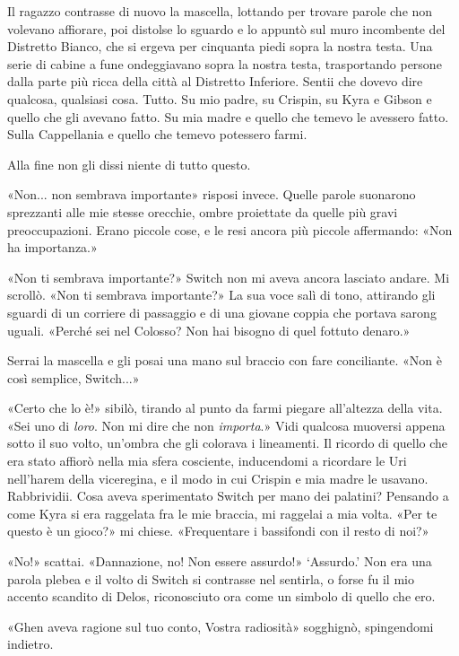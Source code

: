 Il ragazzo contrasse di nuovo la mascella, lottando per trovare parole
che non volevano affiorare, poi distolse lo sguardo e lo appuntò sul
muro incombente del Distretto Bianco, che si ergeva per cinquanta piedi
sopra la nostra testa. Una serie di cabine a fune ondeggiavano sopra la
nostra testa, trasportando persone dalla parte più ricca della città al
Distretto Inferiore. Sentii che dovevo dire qualcosa, qualsiasi cosa.
Tutto. Su mio padre, su Crispin, su Kyra e Gibson e quello che gli
avevano fatto. Su mia madre e quello che temevo le avessero fatto. Sulla
Cappellania e quello che temevo potessero farmi.

Alla fine non gli dissi niente di tutto questo.

«Non... non sembrava importante» risposi invece. Quelle parole suonarono
sprezzanti alle mie stesse orecchie, ombre proiettate da quelle più
gravi preoccupazioni. Erano piccole cose, e le resi ancora più piccole
affermando: «Non ha importanza.»

«Non ti sembrava importante?» Switch non mi aveva ancora lasciato
andare. Mi scrollò. «Non ti sembrava importante?» La sua voce salì di
tono, attirando gli sguardi di un corriere di passaggio e di una giovane
coppia che portava sarong uguali. «Perché sei nel Colosso? Non hai
bisogno di quel fottuto denaro.»

Serrai la mascella e gli posai una mano sul braccio con fare
conciliante. «Non è così semplice, Switch...»

«Certo che lo è!» sibilò, tirando al punto da farmi piegare all'altezza
della vita. «Sei uno di \emph{loro}. Non mi dire che non
\emph{importa}.» Vidi qualcosa muoversi appena sotto il suo volto,
un'ombra che gli colorava i lineamenti. Il ricordo di quello che era
stato affiorò nella mia sfera cosciente, inducendomi a ricordare le Uri
nell'harem della viceregina, e il modo in cui Crispin e mia madre le
usavano. {Rabbrividii}. Cosa aveva sperimentato Switch per mano dei
palatini? Pensando a come Kyra si era raggelata fra le mie braccia, mi
raggelai a mia volta. «Per te questo è un gioco?» mi chiese.
«Frequentare i bassifondi con il resto di noi?»

«No!» scattai. «Dannazione, no! Non essere assurdo!» `Assurdo.' Non era
una parola plebea e il volto di Switch si contrasse nel sentirla, o
forse fu il mio accento scandito di Delos, riconosciuto ora come un
simbolo di quello che ero.

«Ghen aveva ragione sul tuo conto, Vostra radiosità» sogghignò,
spingendomi indietro.

